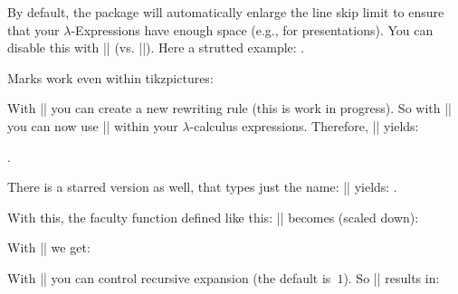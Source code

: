 \documentclass[parskip=half,english,numbers=noenddot,footnotes=nomultiple,oneside]{scrartcl}
\begin{document}
   By default, the package will automatically enlarge the line skip limit to ensure that your \(\lambda\)-Expressions have enough space (e.g., for presentations). You can disable this with |\lcDoNotStrutLine| (vs. |\lcDoStrutLine|). Here a strutted example: {\lcDoStrutLine{}}.


   Marks work even within tikzpictures:
   \begin{center}
   \end{center}

   With |\lcCreateNewRewritingRule| you can create a new rewriting rule (this is work in progress).
   So with |\lcCreateNewRewritingRule{}| you can now use |\cons| within your \(\lambda\)-calculus expressions. Therefore, \lcCreateNewRewritingRule{}|| yields:

   .

   There is a starred version as well, that types just the name: || yields: .

   With this, the faculty function defined like this: || becomes (scaled down):

   {%
      \tiny{}%
   }

   With |\lcDisableLambdaRanges| we get:

   {%
      \lcDisableLambdaRanges
      \tiny{}%
   }

   With |\lcMaximumRewritingRuleExpandDepth| you can control recursive expansion (the default is~\(1\)). So || results in:

   {%
      \tiny{}%
   }
\end{document}
